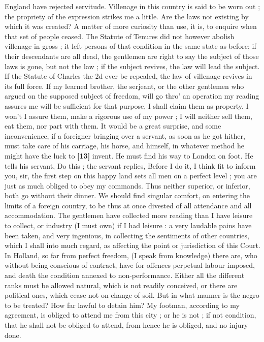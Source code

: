 \documentclass[a4paper]{article}
\begin{document}
England have rejected servitude. Villenage in this country is said to be worn out ; the propriety of the expression strikes me a little. Are the laws not existing by which it was created? A matter of more curiosity than use, it is, to enquire when that set of people ceased. The Statute of Tenures did not however abolish villenage in gross ; it left persons of that condition in the same state as before;  if their descendants are all dead, the gentlemen are right to say the subject of those laws is gone, but not the law ; if the subject revives, the law will lead the subject. If the Statute of Charles the 2d ever be repealed, the law of villenage revives in its full force. If my learned brother, the serjeant, or the other gentlemen who argued on the supposed subject of freedom, will go thro' an operation my reading assures me will be sufficient for that purpose, I shall claim them as property. I won't I assure them, make a rigorous use of my power ; I will neither sell them, eat them, nor part with them. It would be a great surprise, and some inconvenience, if a foreigner bringing over a servant, as soon as he got hither, must take care of his carriage, his horse, and himself, in whatever method he might have the luck to \textbf{[13]} invent. He must find his way to London on foot. He tells his servant, Do this ; the servant replies, Before I do it, I think fit to inform you, sir, the first step on this happy land sets all men on a perfect level ; you are just as much obliged to obey my commands. Thus neither superior, or inferior, both go without their dinner. We should find singular comfort, on entering the limits of a foreign country, to be thus at once divested of all attendance and all accommodation. The gentlemen have collected more reading than I have leisure to collect, or industry (I must own) if I had leisure : a very laudable pains have been taken, and very ingenious, in collecting the sentiments of other countries, which I shall into much regard, as affecting the point or jurisdiction of this Court. In Holland, so far from perfect freedom, (I speak from knowledge) there are, who without being conscious of contract, have for offences perpetual labour imposed, and death the condition annexed to non-performance. Either all the different ranks must be allowed natural, which is not readily conceived, or there are political ones, which cease not on change of soil. But in what manner is the negro to be treated? How far lawful to detain him? My footman, according to my agreement, is obliged to attend me from this city ; or he is not ; if not condition, that he shall not be obliged to attend, from hence he is obliged, and no injury done.
\end{document}
